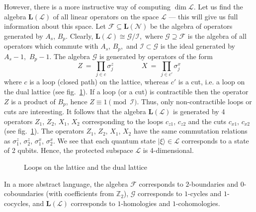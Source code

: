 \documentclass[12pt]{article}
\newcommand*{\epsfscale}[1]{\def\epsfsize##1##2{#1##1}}
\newcommand{\Z}{\mathbb{Z}}
\newcommand{\LL}{\mathbf{L}}
\newcommand{\calF}{\mathcal{F}}
\newcommand{\calG}{\mathcal{G}}
\newcommand{\calI}{\mathcal{I}}
\newcommand{\calL}{\mathcal{L}}
\newcommand{\calN}{\mathcal{N}}
\begin{document}
However, there is a more instructive way of computing $\dim\calL$. Let us find
the algebra $\LL(\calL)$ of all linear operators on the space $\calL$ --- this
will give us full information about this space. Let $\calF\subseteq\LL(\calN)$ 
be the algebra of operators generated by $A_s$, $B_p$. Clearly, 
$\LL(\calL)\cong\calG/\calI$,\, where $\calG\supseteq\calF$ is the algebra of 
all operators which commute with $A_s$, $B_p$,\, and $\calI\subset\calG$ is 
the ideal generated by $A_s\!-\!1$,\, $B_p\!-\!1$. The algebra $\calG$ is 
generated by operators of the form
\[
  Z\ =\ \prod_{j\in c}\sigma^z_j \qquad\qquad X\ =\ \prod_{j\in c'}\sigma^x_j
\]
where $c$ is a loop (closed path) on the lattice, whereas $c'$ is a cut, i.e. 
a loop on the dual lattice (see fig.~\ref{fig_loops}). If a loop (or a cut)
is contractible then the operator $Z$ is a product of $B_p$, hence 
$Z\equiv 1\pmod{\calI}$. Thus, only non-contractible loops or cuts are 
interesting. It follows that the algebra $\LL(\calL)$ is generated by 
4 operators $Z_1$, $Z_2$, $X_1$, $X_2$ corresponding  to the loops $c_{z1}$, 
$c_{z2}$ and the cuts $c_{x1}$, $c_{x2}$ (see fig.~\ref{fig_loops}). 
The operators $Z_1$, $Z_2$, $X_1$, $X_2$ have the same commutation relations 
as $\sigma^z_1$, $\sigma^z_2$, $\sigma^x_1$, $\sigma^x_2$. We see that each 
quantum state $|\xi\rangle\in\calL$ corresponds to a state of 2 qubits. Hence, 
the protected subspace $\calL$ is 4-dimensional. 

\begin{figure}[t]
\centerline{\epsfscale{0.6}}
\caption{Loops on the lattice and the dual lattice}
\label{fig_loops}
\end{figure}

In a more abstract language, the algebra $\calF$ corresponds to $2$-boundaries 
and $0$-coboundaries (with coefficients from $\Z_2$), $\calG$ corresponds to 
$1$-cycles and $1$-cocycles, and $\LL(\calL)$ corresponds to $1$-homologies
and $1$-cohomologies.
\end{document}
